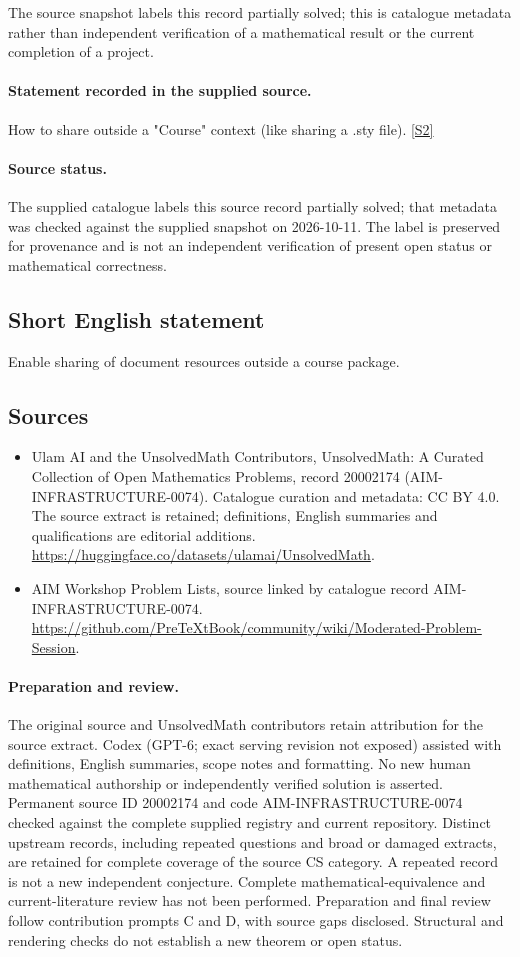 \documentclass[11pt]{article}
\begin{document}
The source snapshot labels this record partially solved; this is catalogue metadata rather than independent verification of a mathematical result or the current completion of a project.
\paragraph{Statement recorded in the supplied source.}
How to share outside a "Course" context (like sharing a .sty file). \href{https://github.com/PreTeXtBook/community/wiki/Moderated-Problem-Session}{[S2]}
\paragraph{Source status.}
The supplied catalogue labels this source record partially solved; that metadata was checked against the supplied snapshot on 2026-10-11. The label is preserved for provenance and is not an independent verification of present open status or mathematical correctness.
\subsection{Short English statement}
Enable sharing of document resources outside a course package.
\subsection{Sources}
\begin{itemize}
\item[S1] Ulam AI and the UnsolvedMath Contributors, UnsolvedMath: A Curated Collection of Open Mathematics Problems, record 20002174 (AIM-INFRASTRUCTURE-0074). Catalogue curation and metadata: CC BY 4.0. The source extract is retained; definitions, English summaries and qualifications are editorial additions.
\url{https://huggingface.co/datasets/ulamai/UnsolvedMath}.
\item[S2] AIM Workshop Problem Lists, source linked by catalogue record AIM-INFRASTRUCTURE-0074.
\url{https://github.com/PreTeXtBook/community/wiki/Moderated-Problem-Session}.
\end{itemize}
\paragraph{Preparation and review.}
The original source and UnsolvedMath contributors retain attribution for the source extract. Codex (GPT-6; exact serving revision not exposed) assisted with definitions, English summaries, scope notes and formatting. No new human mathematical authorship or independently verified solution is asserted. Permanent source ID 20002174 and code AIM-INFRASTRUCTURE-0074 checked against the complete supplied registry and current repository. Distinct upstream records, including repeated questions and broad or damaged extracts, are retained for complete coverage of the source CS category. A repeated record is not a new independent conjecture. Complete mathematical-equivalence and current-literature review has not been performed. Preparation and final review follow contribution prompts C and D, with source gaps disclosed. Structural and rendering checks do not establish a new theorem or open status.
\label{end:20002174}
\end{document}
